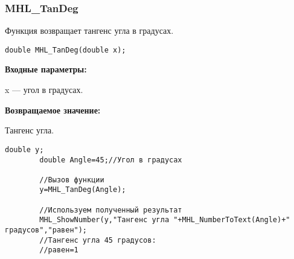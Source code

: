 \documentclass[a4paper,12pt]{article}
\begin{document}
\subsubsection{MHL\_TanDeg}\label{MHL_TanDeg}

Функция возвращает тангенс угла в градусах.


\begin{lstlisting}[label=code_syntax_MHL_TanDeg,caption=Синтаксис]
double MHL_TanDeg(double x);
\end{lstlisting}

\textbf{Входные параметры:}

 x --- угол в градусах.

\textbf{Возвращаемое значение:}

Тангенс угла.


\begin{lstlisting}[label=code_use_MHL_TanDeg,caption=Пример использования]
        double y;
        double Angle=45;//Угол в градусах

        //Вызов функции
        y=MHL_TanDeg(Angle);

        //Используем полученный результат
        MHL_ShowNumber(y,"Тангенс угла "+MHL_NumberToText(Angle)+" градусов","равен");
        //Тангенс угла 45 градусов:
        //равен=1
\end{lstlisting}

\newpage
\end{document}
